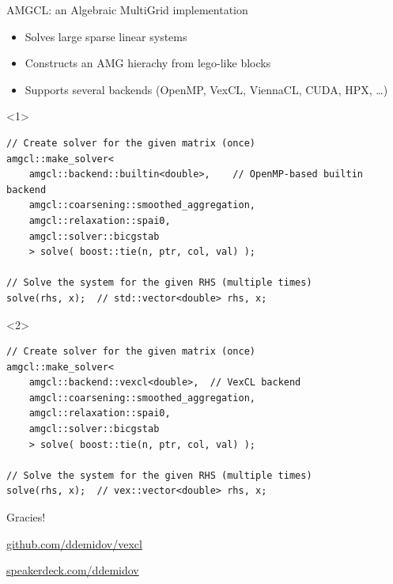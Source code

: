 \documentclass[@BEAMER_OPTIONS@]{beamer}
\begin{document}
\begin{frame}[fragile]{AMGCL: an Algebraic MultiGrid implementation}
    \begin{itemize}
        \item Solves large sparse linear systems
        \item Constructs an AMG hierachy from lego-like blocks
        \item Supports several backends (OpenMP, VexCL, ViennaCL, CUDA, HPX,
            \ldots)
    \end{itemize}
    \begin{onlyenv}<1>
        \begin{exampleblock}{}
            \begin{lstlisting}
// Create solver for the given matrix (once)
amgcl::make_solver<
    amgcl::backend::builtin<double>,    // OpenMP-based builtin backend
    amgcl::coarsening::smoothed_aggregation,
    amgcl::relaxation::spai0,
    amgcl::solver::bicgstab
    > solve( boost::tie(n, ptr, col, val) );

// Solve the system for the given RHS (multiple times)
solve(rhs, x);  // std::vector<double> rhs, x;
            \end{lstlisting}
        \end{exampleblock}
    \end{onlyenv}
    \begin{onlyenv}<2>
        \begin{exampleblock}{}
            \begin{lstlisting}
// Create solver for the given matrix (once)
amgcl::make_solver<
    amgcl::backend::vexcl<double>,  // VexCL backend
    amgcl::coarsening::smoothed_aggregation,
    amgcl::relaxation::spai0,
    amgcl::solver::bicgstab
    > solve( boost::tie(n, ptr, col, val) );

// Solve the system for the given RHS (multiple times)
solve(rhs, x);  // vex::vector<double> rhs, x;
            \end{lstlisting}
        \end{exampleblock}
    \end{onlyenv}
\end{frame}

\begin{frame}
    \begin{center}
        \huge{Gracies!}
    \end{center}
    \vspace{3\baselineskip}
    \begin{description}[\hspace{0.6\textwidth}]
        \item[Source code:] \href{https://github.com/ddemidov/vexcl}{github.com/ddemidov/vexcl}
        \item[The slides:] \href{https://speakerdeck.com/ddemidov}{speakerdeck.com/ddemidov}
    \end{description}
\end{frame}

\note{ }
\end{document}
